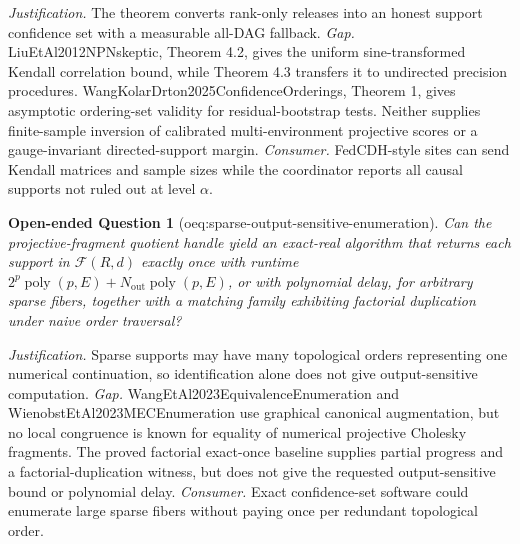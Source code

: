 \documentclass{article}
\newtheorem{openendedquestion}{Open-ended Question}
\begin{document}
\par\smallskip\noindent \textit{Justification.} The theorem converts rank-only releases into an honest support confidence set with a measurable all-DAG fallback. \textit{Gap.} LiuEtAl2012NPNskeptic, Theorem 4.2, gives the uniform sine-transformed Kendall correlation bound, while Theorem 4.3 transfers it to undirected precision procedures. WangKolarDrton2025ConfidenceOrderings, Theorem 1, gives asymptotic ordering-set validity for residual-bootstrap tests. Neither supplies finite-sample inversion of calibrated multi-environment projective scores or a gauge-invariant directed-support margin. \textit{Consumer.} FedCDH-style sites can send Kendall matrices and sample sizes while the coordinator reports all causal supports not ruled out at level \(\alpha\).

\begin{openendedquestion}[oeq:sparse-output-sensitive-enumeration]\label{oeq:sparse-output-sensitive-enumeration}
Can the projective-fragment quotient handle yield an exact-real algorithm that returns each support in \(\mathcal F(R,d)\) exactly once with runtime \(2^p\operatorname{poly}(p,E)+N_{\mathrm{out}}\operatorname{poly}(p,E)\), or with polynomial delay, for arbitrary sparse fibers, together with a matching family exhibiting factorial duplication under naive order traversal?
\end{openendedquestion}
\par\smallskip\noindent \textit{Justification.} Sparse supports may have many topological orders representing one numerical continuation, so identification alone does not give output-sensitive computation. \textit{Gap.} WangEtAl2023EquivalenceEnumeration and WienobstEtAl2023MECEnumeration use graphical canonical augmentation, but no local congruence is known for equality of numerical projective Cholesky fragments. The proved factorial exact-once baseline supplies partial progress and a factorial-duplication witness, but does not give the requested output-sensitive bound or polynomial delay. \textit{Consumer.} Exact confidence-set software could enumerate large sparse fibers without paying once per redundant topological order.
\end{document}
